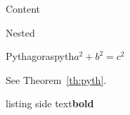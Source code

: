 \documentclass{article}
\begin{document}
\begin{tcolorbox}[title=Box,colback=red!5]Content \begin{note}Nested\end{note}\end{tcolorbox}
\begin{thm}{Pythagoras}{pyth}$a^2+b^2=c^2$\end{thm} See Theorem~\ref{th:pyth}.
\begin{tcolorbox}[breakable,enhanced,title=Long box,sharp corners,drop shadow]\lipsum[1-5]\end{tcolorbox}
\begin{tcblisting}{listing side text}\textbf{bold}\end{tcblisting}
\end{document}
